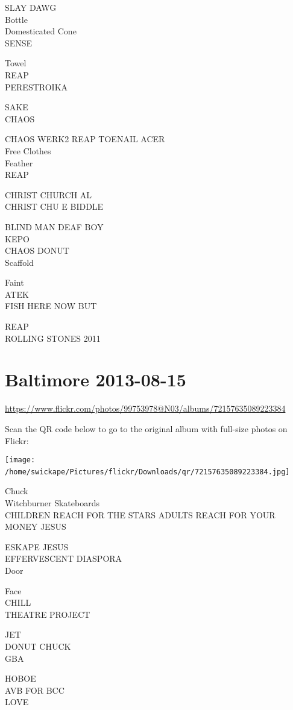 \documentclass[10pt,letterpaper]{article}
\begin{document}
SLAY DAWG\\
Bottle\\
Domesticated Cone\\
SENSE

Towel\\
REAP\\
PERESTROIKA

SAKE\\
CHAOS

CHAOS WERK2 REAP TOENAIL ACER\\
Free Clothes\\
Feather\\
REAP

CHRIST CHURCH AL\\
CHRIST CHU E BIDDLE

BLIND MAN DEAF BOY\\
KEPO\\
CHAOS DONUT\\
Scaffold

Faint\\
ATEK\\
FISH HERE NOW BUT

REAP\\
ROLLING STONES 2011
\

\section*{Baltimore 2013-08-15}

\url{https://www.flickr.com/photos/99753978@N03/albums/72157635089223384}

Scan the QR code below to go to the original album with full-size photos on Flickr:

\texttt{[image: /home/swickape/Pictures/flickr/Downloads/qr/72157635089223384.jpg]}
\

Chuck\\
Witchburner Skateboards\\
CHILDREN REACH FOR THE STARS ADULTS REACH FOR YOUR MONEY JESUS

ESKAPE JESUS\\
EFFERVESCENT DIASPORA\\
Door

Face\\
CHILL\\
THEATRE PROJECT

JET\\
DONUT CHUCK\\
GBA

HOBOE\\
AVB FOR BCC\\
LOVE
\end{document}
